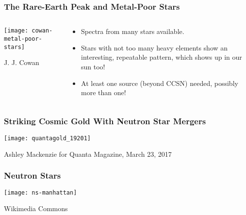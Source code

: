 \documentclass[]{beamer}
\begin{document}
\begin{frame}
  \frametitle{The Rare-Earth Peak and Metal-Poor Stars}
  \begin{columns}
    \begin{column}{6cm}
      \begin{center}
        \texttt{[image: cowan-metal-poor-stars]}
      \end{center}
      J. J. Cowan
    \end{column}
    \begin{column}{6cm}
      \begin{itemize}
      \item Spectra from many stars available.
      \item Stars with not too many heavy elements show an interesting,
        repeatable pattern, which shows up in our sun too!
      \item At least one source (beyond CCSN) needed, possibly more
        than one!
      \end{itemize}      
    \end{column}
  \end{columns}
\end{frame}

\begin{frame}
  \frametitle{Striking Cosmic Gold With Neutron Star Mergers}
  \begin{center}
    \texttt{[image: quantagold\_19201]}
  \end{center}
  Ashley Mackenzie for Quanta Magazine, March 23, 2017
\end{frame}


\begin{frame}
  \frametitle{Neutron Stars}
  \begin{center}
    \texttt{[image: ns-manhattan]}
  \end{center}
  Wikimedia Commons
\end{frame}
\end{document}
